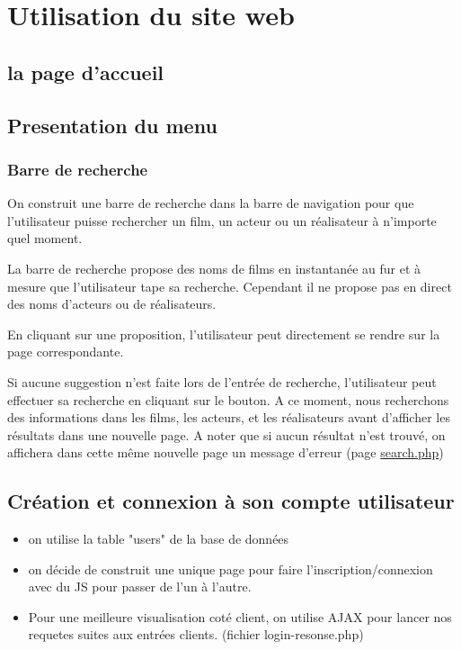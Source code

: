 \documentclass[a4paper, 11pt]{MyReport}
\begin{document}
	\chapter{Utilisation du site web}

		\section{la page d'accueil}

		\section{Presentation du menu}

			\subsection{Barre de recherche}

				On construit une barre de recherche dans la barre de navigation pour que l'utilisateur puisse rechercher un film, un acteur ou un réalisateur à n'importe quel moment.

				La barre de recherche propose des noms de films en instantanée au fur et à mesure que l'utilisateur tape sa recherche. Cependant il ne propose pas en direct des noms d'acteurs ou de réalisateurs.

				En cliquant sur une proposition, l'utilisateur peut directement se rendre sur la page correspondante.

				Si aucune suggestion n'est faite lors de l'entrée de recherche, l'utilisateur peut effectuer sa recherche en cliquant sur le bouton. A ce moment, nous recherchons des informations dans les films, les acteurs, et les réalisateurs avant d'afficher les résultats dans une nouvelle page. A noter que si aucun résultat n'est trouvé, on affichera dans cette même nouvelle page un message d'erreur (page \url{search.php})



		\section{Création et connexion à son compte utilisateur}

			\begin{itemize}
				\item on utilise la table "users" de la base de données
				\item on décide de construit une unique page pour faire l'inscription/connexion
				avec du JS pour passer de l'un à l'autre.
				\item Pour une meilleure visualisation coté client, on utilise AJAX pour lancer nos requetes suites aux entrées clients. (fichier login-resonse.php)
			\end{itemize}
\end{document}

